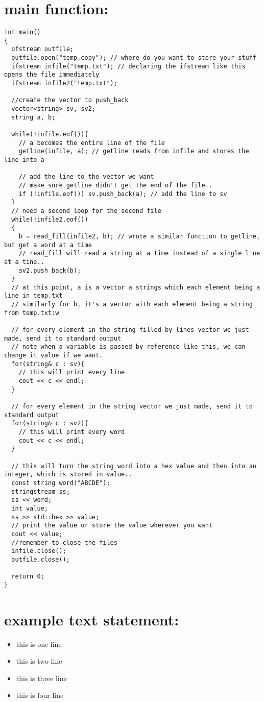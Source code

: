 \documentclass[11pt]{article}
\begin{document}
\section{main function:}
\label{sec:org8deccee}
\begin{verbatim}
int main()
{
  ofstream outfile;
  outfile.open("temp.copy"); // where do you want to store your stuff
  ifstream infile("temp.txt"); // declaring the ifstream like this opens the file immediately
  ifstream infile2("temp.txt");

  //create the vector to push_back
  vector<string> sv, sv2;
  string a, b;

  while(!infile.eof()){
    // a becomes the entire line of the file
    getline(infile, a); // getline reads from infile and stores the line into a

    // add the line to the vector we want
    // make sure getline didn't get the end of the file..
    if (!infile.eof()) sv.push_back(a); // add the line to sv
  }
  // need a second loop for the second file
  while(!infile2.eof())
  {
    b = read_fill(infile2, b); // wrote a similar function to getline, but get a word at a time
    // read_fill will read a string at a time instead of a single line at a tine..
    sv2.push_back(b);
  }
  // at this point, a is a vector a strings which each element being a line in temp.txt
  // similarly for b, it's a vector with each element being a string from temp.txt:w

  // for every element in the string filled by lines vector we just made, send it to standard output
  // note when a variable is passed by reference like this, we can change it value if we want.
  for(string& c : sv){
    // this will print every line
    cout << c << endl;
  }

  // for every element in the string vector we just made, send it to standard output
  for(string& c : sv2){
    // this will print every word
    cout << c << endl;
  }

  // this will turn the string word into a hex value and then into an integer, which is stored in value..
  const string word("ABCDE");
  stringstream ss;
  ss << word;
  int value;
  ss >> std::hex >> value;
  // print the value or store the value wherever you want
  cout << value;
  //remember to close the files
  infile.close();
  outfile.close();

  return 0;
}
\end{verbatim}

\section{example text statement:}
\label{sec:org9b1e0ce}
\begin{itemize}
\item this is one line
\item this is two line
\item this is three line
\item this is four line
\end{itemize}
\end{document}
